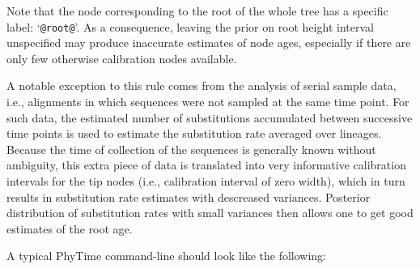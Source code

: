 \documentclass[a4paper,12pt]{article}
\newcommand{\x}[1]{\texttt{#1}}
\begin{document}
\begin{itemize}

Note   that  the  node corresponding  to  the  root of  the  whole tree  has  a specific  label:
`\x{@root@}'.  {\color{red}{It is important  to specify upper and lower bounds for  the root node in
order to ensure convergence  of the Gibbs sampler. If the prior interval for  the root height is not
specified, the  upper bound will be set  to the upper bound  of the oldest calibration  node and the
lower bound  will be set to twice  this age.}}  As a  consequence, leaving the prior  on root height
interval unspecified may produce inaccurate estimates of node ages, especially if there are only few
otherwise calibration nodes available.

A notable exception to this rule comes from the analysis of serial sample 
data, i.e., alignments in which sequences were not sampled at the same time point.  For such data,
the estimated number of substitutions accumulated between successive time points is used to estimate
the substitution rate averaged over lineages. Because the time of collection of the sequences is
generally known without ambiguity, this extra piece of data is translated into very informative
calibration intervals for the tip nodes (i.e., calibration interval of zero width), which in turn
results in substitution rate estimates with descreased variances.  Posterior distribution of
substitution rates with small variances then allows one to get good estimates of the root age.

\end{itemize}

A typical PhyTime command-line should look like the following\index{command-line options!\x{--calibration}}:
\end{document}
